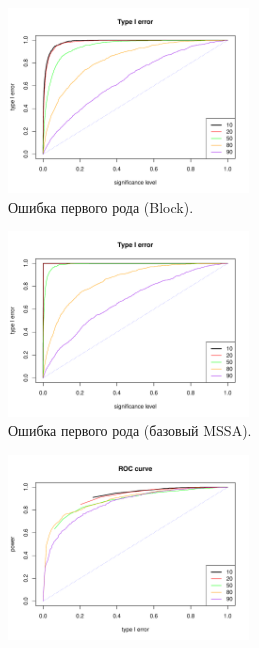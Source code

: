 \documentclass[specialist,
substylefile = spbu_report.rtx,
subf,href,colorlinks=true, 12pt]{disser}
\theoremstyle{definition}
\begin{document}
\begin{figure}[h!]
	\captionsetup[subfigure]{justification=Centering}
	\begin{subfigure}[t]{0.45\textwidth}
		\centering
		\includegraphics[width=0.7\textwidth]{img/type1error_block_fa.pdf}
		\caption{Ошибка первого рода (Block).}
		\label{fig:block_fa_a}
	\end{subfigure}\hspace{\fill}
	\begin{subfigure}[t]{0.45\textwidth}
		\centering
		\includegraphics[width=0.7\textwidth]{img/type1error_mssa_fa.pdf}
		\caption{Ошибка первого рода (базовый MSSA).}
	\end{subfigure}
	\bigskip
	\begin{subfigure}[t]{0.45\textwidth}
		\centering
		\includegraphics[width=0.7\textwidth]{img/roc_block_fa.pdf}

\end{subfigure}
\end{figure}
\end{document}
